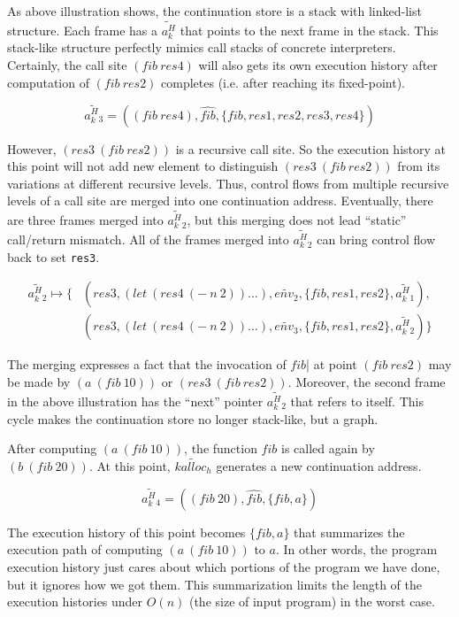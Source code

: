 \documentclass[12pt]{report}
\begin{document}
As above illustration shows, the continuation store is a stack with linked-list structure. Each frame has a $\widetilde{a^H_k}$ that points to the next frame in the stack. This stack-like structure perfectly mimics call stacks of concrete interpreters. Certainly, the call site $(fib\ res4)$ will also gets its own execution history after computation of $(fib\ res2)$ completes (i.e. after reaching its fixed-point).

\[
\widetilde{a^H_k{}_3} = ((fib\ res4), \widehat{fib}, \{fib, res1, res2, res3, res4\})
\]

However, $(res3\ (fib\ res2))$ is a recursive call site. So the execution history at this point will not add new element to distinguish $(res3\ (fib\ res2))$ from its variations at different recursive levels. Thus, control flows from multiple recursive levels of a call site are merged into one continuation address. Eventually, there are three frames merged into $\widetilde{a^H_k{}_2}$, but this merging does not lead ``static'' call/return mismatch. All of the frames merged into $\widetilde{a^H_k{}_2}$ can bring control flow back to set \verb|res3|.

\[
\begin{aligned}
\label{eq:show-stack}
\widetilde{a^H_k{}_2} \mapsto \{ {}& (res3, (let\ (res4\ (-\ n\ 2)) \dots), \widetilde{env_2}, \{fib, res1, res2\}, \widetilde{a^H_k{}_1}), {} \\
                                 {}& (res3, (let\ (res4\ (-\ n\ 2)) \dots), \widetilde{env_3}, \{fib, res1, res2\}, \widetilde{a^H_k{}_2}) \}
\end{aligned}
\]

The merging expresses a fact that the invocation of $fib$| at point $(fib\ res2)$ may be made by $(a\ (fib\ 10))$ or $(res3\ (fib\ res2))$. Moreover, the second frame in the above illustration has the ``next'' pointer $\widetilde{a^H_k{}_2}$ that refers to itself. This cycle makes the continuation store no longer stack-like, but a graph.

After computing $(a\ (fib\ 10))$, the function $fib$ is called again by $(b\ (fib\ 20))$. At this point, $\widetilde{kalloc_h}$ generates a new continuation address.

\[
\widetilde{a^H_k{}_4} = ((fib\ 20), \widehat{fib}, \{fib, a\})
\]

The execution history of this point becomes $\{fib, a\}$ that summarizes the execution path of computing $(a\ (fib\ 10))$ to $a$. In other words, the program execution history just cares about which portions of the program we have done, but it ignores how we got them. This summarization limits the length of the execution histories under $O(\textit{n})$ (the size of input program) in the worst case.
\end{document}

